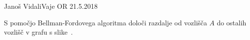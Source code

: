 \begin{naloga}{Janoš Vidali}{Vaje OR 21.5.2018}
\begin{vprasanje}
S pomočjo Bellman-Fordovega algoritma
določi razdalje od vozlišča $A$ do ostalih vozlišč
v grafu s slike~\fig.

\begin{slika}
\pgfslika
{}
\end{slika}
\end{vprasanje}
\begin{odgovor}
\end{odgovor}
\end{naloga}

